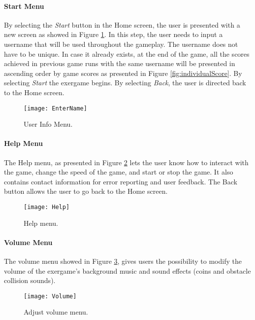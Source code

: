 \paragraph{Start Menu}
By selecting the \textit{Start} button in the Home screen, the user is presented with a new screen as showed in Figure \ref{fig:userinfo}. In this step, the user needs to input a username that will be used throughout the gameplay. The username does not have to be unique. In case it already exists, at the end of the game, all the scores achieved in previous game runs with the same username will be presented in ascending order by game scores as presented in Figure \ref{fig:individualScore}. By selecting \textit{Start} the exergame begins. By selecting \textit{Back}, the user is directed back to the Home screen.\\
\begin{figure}[h]
    \centering
    \texttt{[image: EnterName]}
    \caption{User Info Menu.}
    \label{fig:userinfo}
\end{figure}
\paragraph{Help Menu}
The Help menu, as presented in Figure \ref{fig:help} lets the user know how to interact with the game, change the speed of the game, and start or stop the game. It also contains contact information for error reporting and user feedback. The Back button allows the user to go back to the Home screen.
\begin{figure}[h]
    \centering
    \texttt{[image: Help]}
    \caption{Help menu.}
    \label{fig:help}
\end{figure}
\paragraph{Volume Menu}
The volume menu showed in Figure \ref{fig:volume}, gives users the possibility to modify the volume of the exergame's background music and sound effects (coins and obstacle collision sounds).\\
\begin{figure}[h]
    \centering
    \texttt{[image: Volume]}
    \caption{Adjust volume menu.}
    \label{fig:volume}
\end{figure}
